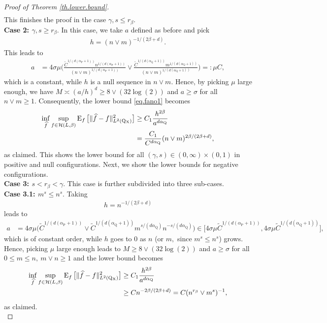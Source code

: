 \documentclass[10pt]{article}
\newcommand{\mH}{\mathcal{H}}
\newcommand{\E}{\operatorname{E}}
\renewcommand{\P}{\operatorname{P}}
\newcommand{\Q}{\operatorname{Q}}
\newcommand{\wh}{\widehat}
\newcommand{\sX}{\mathrm{X}}
\begin{document}
\begin{proof}[Proof of Theorem \ref{th.lower.bound}]
\begin{align*}
    \end{align*}
    This finishes the proof in the case $\gamma, s \leq r_\beta.$\\
    \noindent\textbf{Case 2: $\gamma, s \geq r_\beta.$} In this case, we take $a$ defined as before and pick 
    \begin{align*}
        h = (n\vee m)^{-1/(2\beta + d)}.
    \end{align*}
    This leads to 
    \begin{align*}
        a &= 4\sigma\mu\Big(\frac{\tilde C^{1/(d(\alpha_{\P} + 1))}n^{1/(d(\alpha_{\P} + 1))}}{(n\vee m)^{1/(d(\alpha_{\P} + 1))}}\vee \frac{\tilde C^{1/(d(\alpha_{\Q} + 1))}m^{1/(d(\alpha_{\Q} + 1))}}{(n\vee m)^{1/(d(\alpha_{\Q} + 1))}}\Big) =: \mu C,
    \end{align*}
    which is a constant, while $h$ is a null sequence in $n\vee m.$ Hence, by picking $\mu$ large enough, we have $M \asymp (a/h)^d \geq 8\vee (32\log(2))$ and  $a \geq \sigma$ for all $n\vee m \geq 1.$ Consequently, the lower bound \eqref{eq.fano1} becomes
    \begin{align*}
        \inf_{\wh f} \sup_{f \in \mH(L, \beta)}\E_{f}\big[\|\wh f - f\|_{L^2(\Q\mathstrut_{\!\sX})}^2\big] &\geq C_1 \frac{h^{2\beta}}{a^{d\alpha_{\Q}}}\\
        &= \frac{C_1}{C^{d\alpha_{\Q}}} (n \vee m)^{2\beta/(2\beta + d)},
    \end{align*}
    as claimed. This shows the lower bound for all $(\gamma, s) \in (0, \infty)\times (0, 1)$ in positive and null configurations. Next, we show the lower bounds for negative configurations.\\
    \noindent\textbf{Case 3: $s < r_\beta < \gamma.$} This case is further subdivided into three sub-cases.\\
    
    \noindent\textbf{Case 3.1: $m^s \leq n^s.$} Taking 
    \begin{align*}
        h = n^{-1/(2\beta + d)}
    \end{align*}
    leads to
    \begin{align*}
        a &= 4\sigma\mu \Big(\tilde C^{1/(d(\alpha_{\P} + 1))} \vee \tilde C^{1/(d(\alpha_{\Q} + 1))}m^{s/(d\alpha_{\Q})}n^{-s/(d\alpha_{\Q})}\Big) \in \big[4\sigma\mu \tilde C^{1/(d(\alpha_{\P} + 1))}, 4\sigma\mu \tilde C^{1/(d(\alpha_{\Q} + 1))}\big],
    \end{align*}
    which is of constant order, while $h$ goes to $0$ as $n$ (or $m,$ since $m^s \leq n^s$) grows. Hence, picking $\mu$ large enough leads to $M \geq 8\vee(32\log(2))$ and $a \geq \sigma$ for all $0 \leq m \leq n,\ m\vee n \geq 1$ and the lower bound becomes
    \begin{align*}
        \inf_{\wh f} \sup_{f \in \mH(L, \beta)}\E_{f}\big[\|\wh f - f\|_{L^2(\Q\mathstrut_{\!\sX})}^2\big] &\geq C_1 \frac{h^{2\beta}}{a^{d\alpha_{\Q}}}\\
        &\geq C n^{-2\beta/(2\beta + d)} = C (n^{r_\beta} \vee m^s)^{-1},
    \end{align*}
    as claimed.\\
    

\end{proof}
\end{document}
